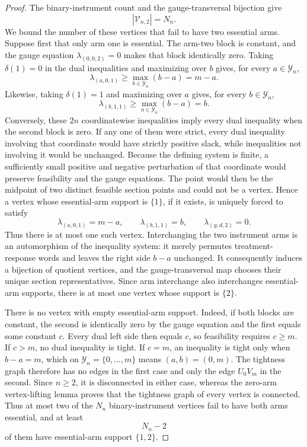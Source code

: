 \documentclass{article}
\begin{document}
\begin{proof}
The binary-instrument count and the gauge-transversal bijection give
\[|\mathcal V_{n,2}|=N_n.\]
We bound the number of these vertices that fail to have two essential arms. Suppose first that only arm one is essential. The arm-two block is constant, and the gauge equation \(\lambda_{(0,0,2)}=0\) makes that block identically zero. Taking \(\delta(1)=0\) in the dual inequalities and maximizing over \(b\) gives, for every \(a\in\mathcal Y_n\),
\[\lambda_{(a,0,1)}\ge\max_{b\in\mathcal Y_n}(b-a)=m-a.\]
Likewise, taking \(\delta(1)=1\) and maximizing over \(a\) gives, for every \(b\in\mathcal Y_n\),
\[\lambda_{(b,1,1)}\ge\max_{a\in\mathcal Y_n}(b-a)=b.\]
Conversely, these \(2n\) coordinatewise inequalities imply every dual inequality when the second block is zero. If any one of them were strict, every dual inequality involving that coordinate would have strictly positive slack, while inequalities not involving it would be unchanged. Because the defining system is finite, a sufficiently small positive and negative perturbation of that coordinate would preserve feasibility and the gauge equations. The point would then be the midpoint of two distinct feasible section points and could not be a vertex. Hence a vertex whose essential-arm support is \(\{1\}\), if it exists, is uniquely forced to satisfy
\[\lambda_{(a,0,1)}=m-a,\qquad \lambda_{(b,1,1)}=b,\qquad \lambda_{(y,d,2)}=0.\]
Thus there is at most one such vertex. Interchanging the two instrument arms is an automorphism of the inequality system: it merely permutes treatment-response words and leaves the right side \(b-a\) unchanged. It consequently induces a bijection of quotient vertices, and the gauge-transversal map chooses their unique section representatives. Since arm interchange also interchanges essential-arm supports, there is at most one vertex whose support is \(\{2\}\).

There is no vertex with empty essential-arm support. Indeed, if both blocks are constant, the second is identically zero by the gauge equation and the first equals some constant \(c\). Every dual left side then equals \(c\), so feasibility requires \(c\ge m\). If \(c>m\), no dual inequality is tight. If \(c=m\), an inequality is tight only when \(b-a=m\), which on \(\mathcal Y_n=\{0,\ldots,m\}\) means \((a,b)=(0,m)\). The tightness graph therefore has no edges in the first case and only the edge \(U_0V_m\) in the second. Since \(n\ge2\), it is disconnected in either case, whereas the zero-arm vertex-lifting lemma proves that the tightness graph of every vertex is connected. Thus at most two of the \(N_n\) binary-instrument vertices fail to have both arms essential, and at least
\[N_n-2\]
of them have essential-arm support \(\{1,2\}\).


\end{proof}
\end{document}
